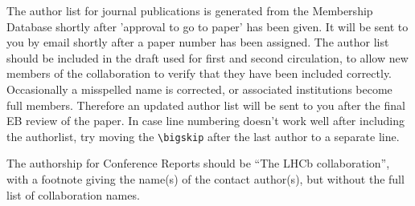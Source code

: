 \documentclass[12pt,a4paper]{article}
\begin{document}
\newpage


%
 
\newpage


The author list for journal publications is generated from the
Membership Database shortly after 'approval to go to paper' has been
given.  It will be sent to you by email shortly after a paper number
has been assigned.  The author list should be included in the draft used for 
first and second circulation, to allow new members of the collaboration to verify
that they have been included correctly. Occasionally a misspelled
name is corrected, or associated institutions become full members.
Therefore an updated author list will be sent to you after the final
EB review of the paper.  In case line numbering doesn't work well
after including the authorlist, try moving the \verb!\bigskip! after
the last author to a separate line.


The authorship for Conference Reports should be ``The LHCb
collaboration'', with a footnote giving the name(s) of the contact
author(s), but without the full list of collaboration names.
\end{document}
